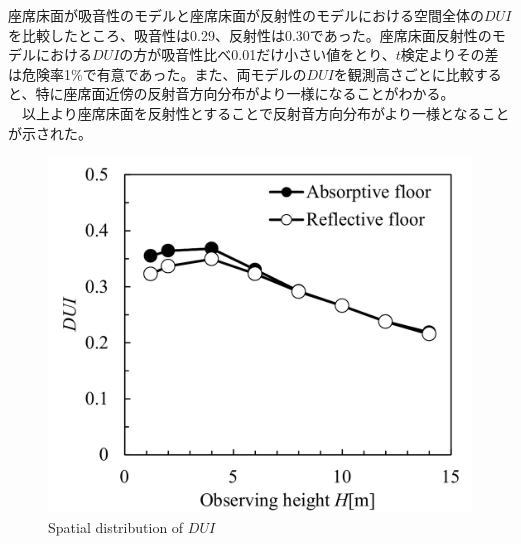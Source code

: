 座席床面が吸音性のモデルと座席床面が反射性のモデルにおける空間全体の$DUI$を比較したところ、吸音性は0.29、反射性は0.30であった。座席床面反射性のモデルにおける$DUI$の方が吸音性比べ0.01だけ小さい値をとり、$t$検定よりその差は危険率1$\%$で有意であった。また、両モデルの$DUI$を観測高さごとに比較すると、特に座席面近傍の反射音方向分布がより一様になることがわかる。\\
　以上より座席床面を反射性とすることで反射音方向分布がより一様となることが示された。
　
\begin{figure}[H]
    \centering
    \includegraphics[keepaspectratio,scale=0.7]{05_att/reflect/DUI_ref2.pdf}
    \caption{\hspace{1mm}Spatial distribution of $DUI$}
    \label{fig:sankaku1_r}
\end{figure}